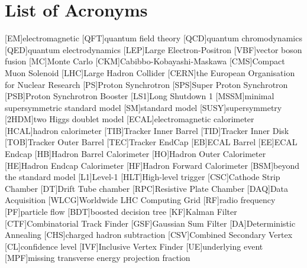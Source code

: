 




\chapter*{List of Acronyms}
\begin{acronym}[CERN]
[EM]{electromagnetic}
[QFT]{quantum field theory}
[QCD]{quantum chromodynamics}
[QED]{quantum electrodynamics}
[LEP]{Large Electron-Positron}
[VBF]{vector boson fusion}
[MC]{Monte Carlo}
[CKM]{Cabibbo-Kobayashi-Maskawa}
[CMS]{Compact Muon Solenoid}
[LHC]{Large Hadron Collider}
[CERN]{the European Organisation for Nuclear Research }
[PS]{Proton Synchrotron}
[SPS]{Super Proton Synchrotron}
[PSB]{Proton Synchrotron Booster}
[LS1]{Long Shutdown 1}
[MSSM]{minimal supersymmetric standard model}
[SM]{standard model}
[SUSY]{supersymmetry}
[2HDM]{two Higgs doublet model}
[ECAL]{electromagnetic calorimeter}
[HCAL]{hadron calorimeter}
[TIB]{Tracker Inner Barrel}
[TID]{Tracker Inner Disk}
[TOB]{Tracker Outer Barrel}
[TEC]{Tracker EndCap}
[EB]{ECAL Barrel}
[EE]{ECAL Endcap}
[HB]{Hadron Barrel Calorimeter}
[HO]{Hadron Outer Calorimeter}
[HE]{Hadron Endcap Calorimeter}
[HF]{Hadron Forward Calorimeter}
[BSM]{beyond the standard model}
[L1]{Level-1}
[HLT]{High-level trigger}
[CSC]{Cathode Strip Chamber}
[DT]{Drift Tube chamber}
[RPC]{Resistive Plate Chamber}
[DAQ]{Data Acquisition}
[WLCG]{Worldwide LHC Computing Grid}
[RF]{radio frequency}
[PF]{particle flow}
[BDT]{boosted decision tree}
[KF]{Kalman Filter}
[CTF]{Combinatorial Track Finder}
[GSF]{Gaussian Sum Filter}
[DA]{Deterministic Annealing}
[CHS]{charged hadron subtraction}
[CSV]{Combined Secondary Vertex}
[CL]{confidence level}
[IVF]{Inclusive Vertex Finder}
[UE]{underlying event}
[MPF]{missing transverse energy projection fraction}
\end{acronym}

